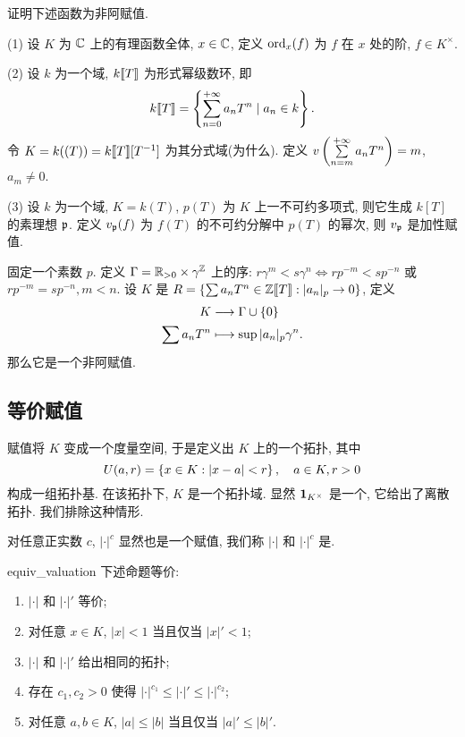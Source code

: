 \begin{exercise}\label{exe:valuation}
证明下述函数为非阿赋值.

(1) 设 $K$ 为 ${\mathbb{C}}$ 上的有理函数全体, $x\in {\mathbb{C}}$, 定义 ${\mathrm{ord}}_x(f)$ 为 $f$ 在 $x$ 处的阶, $f\in K^\times$.

(2) 设 $k$ 为一个域, $k\llbracket T\rrbracket$ 为形式幂级数环, 即
  \[k\llbracket T\rrbracket=\left\{\sum_{n=0}^{+\infty} a_n T^n\mid a_n\in k\right\}.\]
令 $K=k((T))=k\llbracket T\rrbracket[T^{-1}]$ 为其分式域(为什么). 定义 $v\left(\sum\limits_{n=m}^{+\infty} a_nT^n\right)=m$, $a_m\neq 0$.

(3) 设 $k$ 为一个域, $K=k(T)$, $p(T)$ 为 $K$ 上一不可约多项式, 则它生成 $k[T]$ 的素理想 ${\mathfrak{p}}$. 定义 $v_{\mathfrak{p}}(f)$ 为 $f(T)$ 的不可约分解中 $p(T)$ 的幂次, 则 $v_{\mathfrak{p}}$ 是加性赋值.
\end{exercise}

\begin{example}
固定一个素数 $p$.
定义 $\Gamma={\mathbb{R}}_{>0}\times\gamma^{\mathbb{Z}}$ 上的序: $r\gamma^m<s\gamma^n\iff r p^{-m}<s p^{-n}$ 或 $r p^{-m}=s p^{-n},m<n$. 
设 $K$ 是 $R=\left\{\sum a_nT^n\in {\mathbb{Z}}\llbracket T\rrbracket: |a_n|_p\rightarrow 0\right\}$, 定义
	\[\begin{split}K &\longrightarrow \Gamma\cup\left\{0\right\} \\ \sum a_n T^n &\longmapsto \sup |a_n|_p\gamma^n.\end{split}\]
那么它是一个非阿赋值.
\end{example}



\subsection{等价赋值}


赋值将 $K$ 变成一个度量空间, 于是定义出 $K$ 上的一个拓扑, 其中 
  \[U(a,r)=\left\{x\in K: |x-a|<r\right\},\quad a\in K, r>0\]
构成一组拓扑基. 在该拓扑下, $K$ 是一个拓扑域. 显然 ${\bf1}_{K^\times}$ 是一个, 它给出了离散拓扑. 我们排除这种情形.

对任意正实数 $c$, $|\cdot|^c$ 显然也是一个赋值, 我们称 $|\cdot|$ 和 $|\cdot|^c$ 是.
\begin{proposition}{}{equiv_valuation}
下述命题等价:
\begin{enumerate}[(1)]
\item $|\cdot|$ 和 $|\cdot|'$ 等价;
\item 对任意 $x\in K$, $|x|<1$ 当且仅当 $|x|'<1$;
\item $|\cdot|$ 和 $|\cdot|'$ 给出相同的拓扑;
\item 存在 $c_1,c_2>0$ 使得 $|\cdot|^{c_1}\le |\cdot|'\le |\cdot|^{c_2}$;
\item 对任意 $a,b\in K$, $|a|\le |b|$ 当且仅当 $|a|'\le |b|'$. 
\end{enumerate}
\end{proposition}

